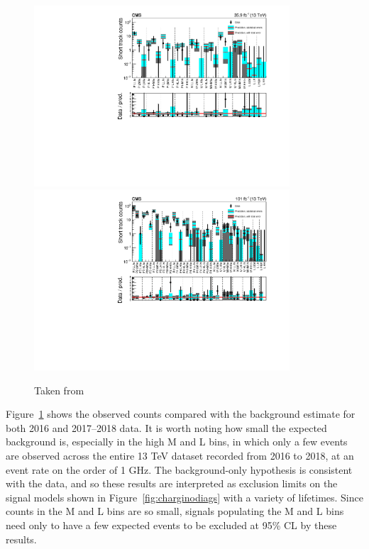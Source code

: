   \begin{figure}[h!]
    \centering
    \includegraphics[width=0.85\textwidth]{figures/MT2_2019/Figure_006-a.pdf}
    \includegraphics[width=0.85\textwidth]{figures/MT2_2019/Figure_006-b.pdf}
    \caption[Comparison of the predicted background and observed data events in the disappearing track search for (upper) 2016 and (lower) 2017--2018.]{Taken from \cite{MT2_2019}}
    \label{fig:distracksresults}
  \end{figure}  

  Figure~\ref{fig:distracksresults} shows the observed counts compared with the background estimate for both 2016 and 2017--2018 data.
  It is worth noting how small the expected background is, especially in the high \pt M and L bins, in which only a few events are observed across the entire 13 TeV dataset recorded from 2016 to 2018, at an event rate on the order of 1 GHz.
  The background-only hypothesis is consistent with the data, and so these results are interpreted as exclusion limits on the signal models shown in Figure~\ref{fig:charginodiags} with a variety of lifetimes.
  Since counts in the M and L bins are so small, signals populating the M and L bins need only to have a few expected events to be excluded at 95\% CL by these results.



